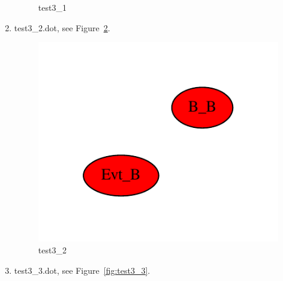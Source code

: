 \documentclass[12pt,a4paper]{report}
\begin{document}
\begin{enumerate}
\begin{figure}
        \caption{test3\_1}
        \label{fig:test3_1}
    \end{figure}
\item test3\_2.dot, see Figure~\ref{fig:test3_2}.
    \begin{figure}
        \centering
        \includegraphics*[width=1.0\textwidth,keepaspectratio]{TestPattern/test3_2.pdf}
        \caption{test3\_2}
        \label{fig:test3_2}
    \end{figure}
\item test3\_3.dot, see Figure~\ref{fig:test3_3}.
    \begin{figure}
        \centering

\end{figure}
\end{enumerate}
\end{document}
